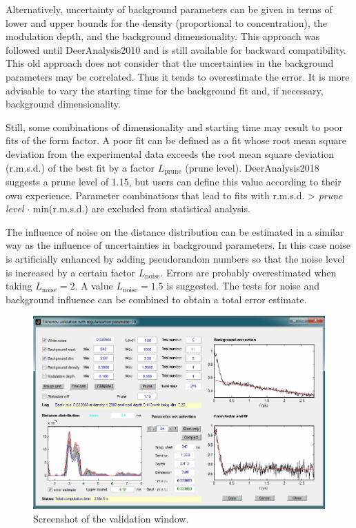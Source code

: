 \documentclass{article}
\begin{document}
Alternatively, uncertainty of background parameters can be given in terms of lower and upper bounds for the density (proportional to concentration), the modulation depth, and the background dimensionality. This approach was followed until DeerAnalysis2010 and is still available for backward compatibility. This old approach does not consider that the uncertainties in the background parameters may be correlated. Thus it tends to overestimate the error. It is more advisable to vary the starting time for the background fit and, if necessary, background dimensionality.

Still, some combinations of dimensionality and starting time may result to poor fits of the form factor. A poor fit can be defined as a fit whose root mean square deviation from the experimental data exceeds the root mean square deviation (r.m.s.d.) of the best fit by a factor $L_\mathrm{prune}$ (prune level). DeerAnalysis2018 suggests a prune level of 1.15, but users can define this value according to their own experience. Parameter combinations that lead to fits with r.m.s.d. > \emph{prune level} $\cdot$ min(r.m.s.d.) are excluded from statistical analysis. 

The influence of noise on the distance distribution can be estimated in a similar way as the influence of uncertainties in background parameters. In this case noise is artificially enhanced by adding pseudorandom numbers so that the noise level is increased by a certain factor $L_\mathrm{noise}$. Errors are probably overestimated when taking $L_\mathrm{noise}=2$. A value $L_\mathrm{noise}=1.5$ is suggested. The tests for noise and background influence can be combined to obtain a total error estimate.

\begin{figure}[ht]
 	\begin{center}
  \includegraphics[width=1.0\textwidth]{fig10.pdf}
	\end{center}
	\caption{Screenshot of the validation window.}
	\label{fig:validation}
\end{figure}
\end{document}
